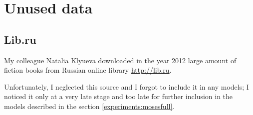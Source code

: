\section{Unused data}
\subsection{Lib.ru}
\label{corpora:libru}

My colleague Natalia Klyueva downloaded in the year 2012 large amount of fiction books from Russian online library \url{http://lib.ru}.

Unfortunately, I neglected this source and I forgot to include it in any models; I noticed it only at a very late stage and too late for further inclusion in the models described in the section \ref{experiments:mosesfull}.
